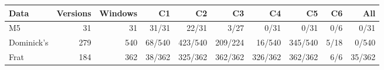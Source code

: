 \begin{tabular}{@{}lrrrrrrrrr@{}}
\toprule
Data & Versions & Windows & C1 & C2 & C3 & C4 & C5 & C6 & All \\
\midrule
M5 & 31 & 31 & 31/31 & 22/31 & 3/27 & 0/31 & 0/31 & 0/6 & 0/31 \\
Dominick's & 279 & 540 & 68/540 & 423/540 & 209/224 & 16/540 & 345/540 & 5/18 & 0/540 \\
Frat & 184 & 362 & 38/362 & 325/362 & 362/362 & 326/362 & 362/362 & 6/6 & 35/362 \\
\bottomrule
\end{tabular}

